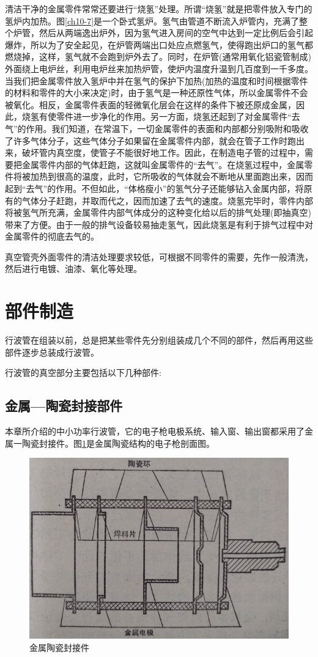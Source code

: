 清洁干净的金属零件常常还要进行“烧氢”处理。所谓“烧氢”就是把零件放入专门的氢炉内加热。图\ref{ch10-7}是一个卧式氢炉。氢气由管道不断流入炉管内，充满了整个炉管，然后从两端逸出炉外，因为氢气进入房间的空气中达到一定比例后会引起爆炸，所以为了安全起见，在炉管两端出口处应点燃氢气，使得跑出炉口的氢气都燃烧掉，这样，氢气就不会跑到炉外去了。同时，在炉管(通常用氧化铝瓷管制成)外面绕上电炉丝，利用电炉丝来加热炉管，使炉内温度升温到几百度到一千多度。当我们把金属零件放入氢炉中并在氢气的保护下加热(加热的温度和时间根据零件的材料和零件的大小来决定)时，由于氢气是一种还原性气体，所以金属零件不会被氧化。相反，金属零件表面的轻微氧化层会在这样的条件下被还原成金属，因此，烧氢有使零件进一步净化的作用。另一方面，烧氢还起到了对金属零件“去气”的作用。我们知道，在常温下，一切金属零件的表面和内部都分别吸附和吸收了许多气体分子，这些气体分子如果留在金属零件内部，就会在管子工作时跑出来，破坏管内真空度，使管子不能很好地工作。因此，在制造电子管的过程中，需要把金属零件内部的气体赶跑，这就叫金属零件的“去气”。在烧氢过程中，金属零件将被加热到很高的温度，此时，它所吸收的气体就会不断地从里面跑出来，因而起到“去气”的作用。不但如此，“体格瘦小”的氢气分子还能够钻入金属内部，将原有的气体分子赶跑，并取而代之，因而加速了去气的速度。烧氢完毕时，零件内部将被氢气所充满，金属零件内部气体成分的这种变化给以后的排气处理(即抽真空)带来了方便。由于一般的排气设备较易抽走氢气，因此烧氢是有利于排气过程中对金属零件的彻底去气的。

真空管壳外面零件的清洁处理要求较低，可根据不同零件的需要，先作一般清洗，然后进行电镀、油漆、氧化等处理。
\section{部件制造}
行波管在组装以前，总是把某些零件先分别组装成几个不同的部件，然后再用这些部件逐步总装成行波管。


行波管的真空部分主要包括以下几种部件:


\subsection{金属—陶瓷封接部件}


本章所介绍的中小功率行波管，它的电子枪电极系统、输入窗、输出窗都采用了金属一陶瓷封接件。图\ref{ch10-8}是金属陶瓷结构的电子枪剖面图。
\begin{figure}[phtb]
	\centering
	\includegraphics[width=0.7\linewidth]{figure/ch10-8}
	\caption{ 金属陶瓷封接件}
	\label{ch10-8}
\end{figure}



